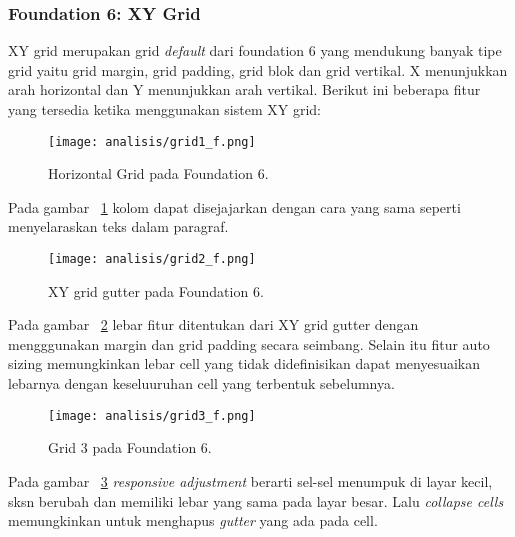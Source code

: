 \subsubsection{Foundation 6: XY Grid}
XY grid merupakan grid \textit{default} dari foundation 6 yang mendukung banyak tipe grid yaitu grid margin, grid padding, grid blok dan grid vertikal. X menunjukkan arah horizontal dan Y menunjukkan arah vertikal.
Berikut ini beberapa fitur yang tersedia ketika menggunakan sistem XY grid:
\begin{figure} [H]
	\centering  
	\texttt{[image: analisis/grid1\_f.png]}
	\caption{Horizontal Grid  pada Foundation 6.}
	\label{fig:grid1f}
\end{figure}
Pada gambar ~\ref{fig:grid1f} kolom dapat disejajarkan dengan cara yang sama seperti menyelaraskan teks dalam paragraf.
\begin{figure} [H]
	\centering  
	\texttt{[image: analisis/grid2\_f.png]}
	\caption{XY grid gutter pada Foundation 6.}
	\label{fig:grid2f}
\end{figure}
Pada gambar ~\ref{fig:grid2f} lebar fitur ditentukan dari XY grid gutter dengan mengggunakan margin dan grid padding secara seimbang. Selain itu fitur auto sizing memungkinkan lebar cell yang tidak didefinisikan dapat menyesuaikan lebarnya dengan keseluuruhan cell yang terbentuk sebelumnya.
\begin{figure} [H]
	\centering  
	\texttt{[image: analisis/grid3\_f.png]}
	\caption{Grid 3 pada Foundation 6.}
	\label{fig:grid3f}
\end{figure}
Pada gambar ~\ref{fig:grid3f} \textit{responsive adjustment} berarti sel-sel menumpuk di layar kecil, sksn berubah dan memiliki lebar yang sama pada layar besar. Lalu \textit{collapse cells} memungkinkan untuk menghapus \textit{gutter} yang ada pada cell.

